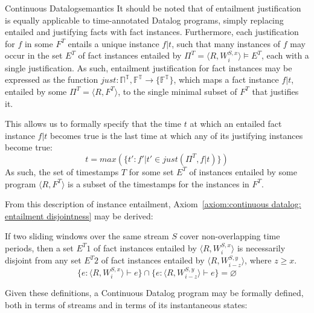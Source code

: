 \begin{nestedsection}{Continuous Datalog}{semantics}
It should be noted that  of entailment
justification is equally applicable to time-annotated Datalog programs,
simply replacing entailed and justifying facts with fact instances.
Furthermore, each justification for $f$ in some $F^T$ entails a unique
instance ${f | t}$, such that many instances of $f$ may occur in the set
$E^T$ of fact instances entailed by
${\Pi^T = \langle R, W^{S,x}_i \rangle \vDash E^T}$, each with a single
justification.  As such, entailment justification for fact instances may be
expressed as the function ${just : \mathbb{\Pi^T} , \mathbb{F^T} \rightarrow \{ \mathbb{F^T} \}}$,
which maps a fact instance ${f | t}$, entailed by some
${\Pi^T = \langle R, F^T \rangle}$, to the single minimal subset of $F^T$ that
justifies it.

This allows us to formally specify that the time $t$ at which an entailed fact
instance ${f | t}$ becomes true is the last time at which any of its
justifying instances become true:
\[ t = max(\{ t' : f' | t' \in just(\Pi^T, f | t) \}) \]
As such, the set of timestamps $T$ for some set $E^T$ of instances entailed by some
program ${\langle R, F^T \rangle}$ is a subset of the timestamps for the instances in $F^T$.

From this description of instance entailment,
Axiom~\ref{axiom:continuous datalog: entailment disjointness} may be
derived:

\begin{axiom}\label{axiom:continuous datalog: entailment disjointness}
If two sliding windows over the same stream $S$ cover non-overlapping time periods,
then a set ${E^T1}$ of fact instances entailed by ${\langle R, W^{S,x}_i \rangle}$
is necessarily disjoint from any set ${E^T2}$ of fact instances entailed by
${\langle R, W^{S,y}_{i-z} \rangle}$, where ${z \geq x}$.
\[ \{ e : \langle R , W^{S,x}_i \rangle \vdash e \} \cap \{ e : \langle R , W^{S,y}_{i-z} \rangle \vdash e \} = \varnothing \]
\end{axiom}

Given these definitions, a Continuous Datalog program may be formally
defined, both in terms of streams and in terms of its instantaneous
states:


\end{nestedsection}
